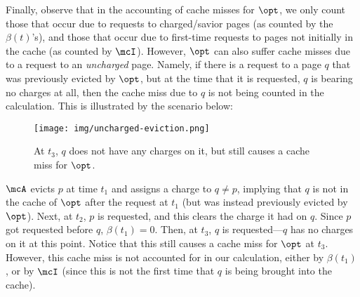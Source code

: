 \documentclass[11pt]{article}
\begin{document}
Finally, observe that in the accounting of cache misses for $\opt$, we only count those that occur due to requests to charged/savior pages (as counted by the $\beta(t)$'s), and those that occur due to first-time requests to pages not initially in the cache (as counted by $\mcI$). However, $\opt$ can also suffer cache misses due to a request to an \textit{uncharged} page. Namely, if there is a request to a page $q$ that was previously evicted by $\opt$, but at the time that it is requested, $q$ is bearing no charges at all, then the cache miss due to $q$ is not being counted in the calculation. This is illustrated by the scenario below: 
\begin{figure}[H]
    \centering
    \texttt{[image: img/uncharged-eviction.png]}
    \caption{At $t_3$, $q$ does not have any charges on it, but still causes a cache miss for $\opt$.}
    \label{fig:uncharged-eviction}
\end{figure}
$\mcA$ evicts $p$ at time $t_1$ and assigns a charge to $q \neq p$, implying that $q$ is not in the cache of $\opt$ after the request at $t_1$ (but was instead previously evicted by $\opt$). Next, at $t_2$, $p$ is requested, and this clears the charge it had on $q$. Since $p$ got requested before $q$, $\beta(t_1)=0$. Then, at $t_3$, $q$ is requested---$q$ has no charges on it at this point. Notice that this still causes a cache miss for $\opt$ at $t_3$. However, this cache miss is not accounted for in our calculation, either by $\beta(t_1)$, or by $\mcI$ (since this is not the first time that $q$ is being brought into the cache).
\end{document}

